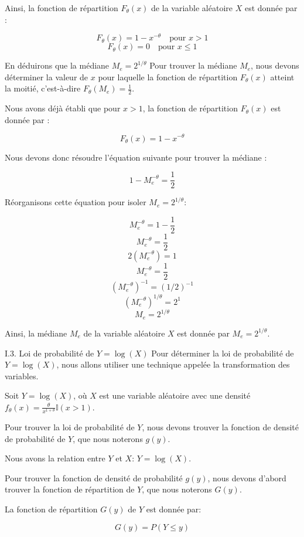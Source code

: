 \documentclass[11pt]{beamer}
\begin{document}
\begin{frame}
	Ainsi, la fonction de répartition $F_\theta(x)$ de la variable aléatoire $X$ est donnée par :
	
	\[ F_\theta(x) = 1 - x^{-\theta} \quad \text{pour } x > 1 \]
	\[ F_\theta(x) = 0 \quad \text{pour } x \leq 1 \]
\end{frame}
\begin{frame}{En déduirons que la médiane $M_e = 2^{1/\theta}$}
	Pour trouver la médiane $M_e$, nous devons déterminer la valeur de $x$ pour laquelle la fonction de répartition $F_\theta(x)$ atteint la moitié, c'est-à-dire $F_\theta(M_e) = \frac{1}{2}$.
	
	Nous avons déjà établi que pour $x > 1$, la fonction de répartition $F_\theta(x)$ est donnée par :
	
	\[ F_\theta(x) = 1 - x^{-\theta} \]
	
	Nous devons donc résoudre l'équation suivante pour trouver la médiane :
	
	\[ 1 - M_e^{-\theta} = \frac{1}{2} \]
	

\end{frame}
\begin{frame}
	Réorganisons cette équation pour isoler $M_e = 2^{1/\theta}$:

\[ M_e^{-\theta} = 1 - \frac{1}{2} \]
\[ M_e^{-\theta} = \frac{1}{2} \]
\[ 2(M_e^{-\theta}) = 1 \]
\[ M_e^{-\theta} = \frac{1}{2} \]
\[ (M_e^{-\theta})^{-1} = (1/2)^{-1} \]
\[ (M_e^{-\theta})^{1/\theta} = 2^1 \]
\[ M_e = 2^{1/\theta} \]

Ainsi, la médiane $M_e$ de la variable aléatoire $X$ est donnée par $M_e = 2^{1/\theta}$.
\end{frame}
\begin{frame}{I.3. Loi de probabilité de $Y = \log(X)$}
	Pour déterminer la loi de probabilité de $Y = \log(X)$, nous allons utiliser une technique appelée la transformation des variables.
	
	Soit $Y = \log(X)$, où $X$ est une variable aléatoire avec une densité $f_\theta(x) = \frac{\theta}{x^{1+\theta}} \mathbb{I}(x > 1)$.
	
	Pour trouver la loi de probabilité de $Y$, nous devons trouver la fonction de densité de probabilité de $Y$, que nous noterons $g(y)$.
	
	Nous avons la relation entre $Y$ et $X$: $Y = \log(X)$.
	
	Pour trouver la fonction de densité de probabilité $g(y)$, nous devons d'abord trouver la fonction de répartition de $Y$, que nous noterons $G(y)$.
	
	La fonction de répartition $G(y)$ de $Y$ est donnée par:
	
	\[ G(y) = P(Y \leq y) \]
	
	
\end{frame}
\end{document}
